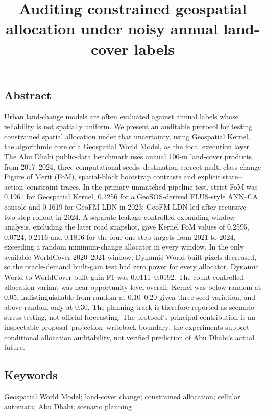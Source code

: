 \documentclass[
]{article}
\title{Auditing constrained geospatial allocation under noisy annual
land-cover labels}
\author{}
\date{}
\begin{document}
\maketitle

\subsection{Abstract}\label{abstract}

Urban land-change models are often evaluated against annual labels whose
reliability is not spatially uniform. We present an auditable protocol
for testing constrained spatial allocation under that uncertainty, using
Geospatial Kernel, the algorithmic core of a Geospatial World Model, as
the focal execution layer. The Abu Dhabi public-data benchmark uses
annual 100-m land-cover products from 2017--2024, three computational
seeds, destination-correct multi-class change Figure of Merit (FoM),
spatial-block bootstrap contrasts and explicit state--action--constraint
traces. In the primary unmatched-pipeline test, strict FoM was 0.1961
for Geospatial Kernel, 0.1256 for a GeoSOS-derived FLUS-style ANN--CA
console and 0.1619 for GeoFM-LDN in 2023; GeoFM-LDN led after recursive
two-step rollout in 2024. A separate leakage-controlled expanding-window
analysis, excluding the later road snapshot, gave Kernel FoM values of
0.2595, 0.0724, 0.2116 and 0.1816 for the four one-step targets from
2021 to 2024, exceeding a random minimum-change allocator in every
window. In the only available WorldCover 2020--2021 window, Dynamic
World built pixels decreased, so the oracle-demand built-gain test had
zero power for every allocator. Dynamic World-to-WorldCover built-gain
F1 was 0.0111--0.0192. The count-controlled allocation variant was near
opportunity-level overall: Kernel was below random at 0.05,
indistinguishable from random at 0.10--0.20 given three-seed variation,
and above random only at 0.30. The planning track is therefore reported
as scenario stress testing, not official forecasting. The protocol's
principal contribution is an inspectable proposal--projection--writeback
boundary; the experiments support conditional allocation auditability,
not verified prediction of Abu Dhabi's actual future.

\subsection{Keywords}\label{keywords}

Geospatial World Model; land-cover change; constrained allocation;
cellular automata; Abu Dhabi; scenario planning
\end{document}
